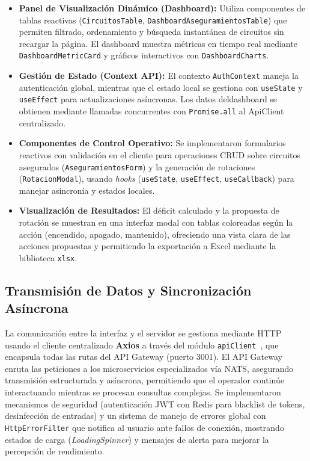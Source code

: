 \begin{itemize}
    \item \textbf{Panel de Visualización Dinámico (Dashboard):} Utiliza componentes de tablas reactivas (\texttt{CircuitosTable}, \texttt{DashboardAseguramientosTable}) que permiten filtrado, ordenamiento y búsqueda instantánea de circuitos sin recargar la página. El dashboard muestra métricas en tiempo real mediante \texttt{DashboardMetricCard} y gráficos interactivos con \texttt{DashboardCharts}.
    \item \textbf{Gestión de Estado (Context API):} El contexto \texttt{AuthContext} maneja la autenticación global, mientras que el estado local se gestiona con \texttt{useState} y \texttt{useEffect} para actualizaciones asíncronas. Los datos deldashboard se obtienen mediante llamadas concurrentes con \texttt{Promise.all} al ApiClient centralizado.
    \item \textbf{Componentes de Control Operativo:} Se implementaron formularios reactivos con validación en el cliente para operaciones CRUD sobre circuitos asegurados (\texttt{AseguramientosForm}) y la generación de rotaciones (\texttt{RotacionModal}), usando \textit{hooks} (\texttt{useState}, \texttt{useEffect}, \texttt{useCallback}) para manejar asincronía y estados locales.
    \item \textbf{Visualización de Resultados:} El déficit calculado y la propuesta de rotación se muestran en una interfaz modal con tablas coloreadas según la acción (encendido, apagado, mantenido), ofreciendo una vista clara de las acciones propuestas y permitiendo la exportación a Excel mediante la biblioteca \texttt{xlsx}.
\end{itemize}

\subsection{Transmisión de Datos y Sincronización Asíncrona}

La comunicación entre la interfaz y el servidor se gestiona mediante HTTP usando el cliente centralizado \textbf{Axios} a través del módulo \texttt{apiClient}~\citep{villalba2021}, que encapsula todas las rutas del API Gateway (puerto 3001). El API Gateway enruta las peticiones a los microservicios especializados vía NATS, asegurando transmisión estructurada y asíncrona, permitiendo que el operador continúe interactuando mientras se procesan consultas complejas. Se implementaron mecanismos de seguridad (autenticación JWT con Redis para blacklist de tokens, desinfección de entradas) y un sistema de manejo de errores global con \texttt{HttpErrorFilter} que notifica al usuario ante fallos de conexión, mostrando estados de carga (\textit{LoadingSpinner}) y mensajes de alerta para mejorar la percepción de rendimiento.

